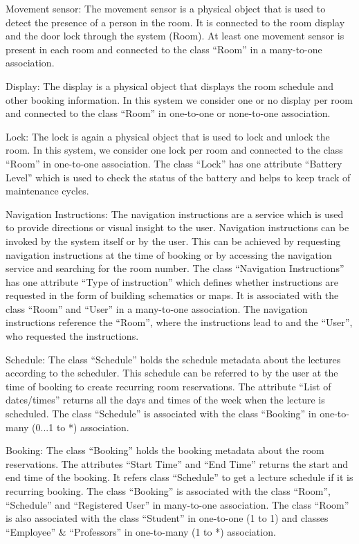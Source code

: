 \documentclass[conference,onecolumn]{IEEEtran}
\begin{document}
		Movement sensor: The movement sensor is a physical object that is used to detect the presence of a person in the room. It is connected to the room display and the door lock through the system (Room). At least one movement sensor is present in each room and connected to the class ``Room'' in a many-to-one association.
		
		Display: The display is a physical object that displays the room schedule and other booking information. In this system we consider one or no display per room and connected to the class ``Room'' in one-to-one or none-to-one association.

		Lock: The lock is again a physical object that is used to lock and unlock the room. In this system, we consider one lock per room and connected to the class ``Room'' in one-to-one association. The class ``Lock'' has one attribute ``Battery Level'' which is used to check the status of the battery and helps to keep track of maintenance cycles.

		Navigation Instructions: The navigation instructions are a service which is used to provide directions or visual insight to the user. Navigation instructions can be invoked by the system itself or by the user. This can be achieved by requesting navigation instructions at the time of booking or by accessing the navigation service and searching for the room number. The class ``Navigation Instructions'' has one attribute ``Type of instruction'' which defines whether instructions are requested in the form of building schematics or maps. It is associated with the class ``Room'' and ``User'' in a many-to-one association. The navigation instructions reference the ``Room'', where the instructions lead to and the ``User'', who requested the instructions.

		Schedule: The class ``Schedule'' holds the schedule metadata about the lectures according to the scheduler. This schedule can be referred to by the user at the time of booking to create recurring room reservations. The attribute ``List of dates/times'' returns all the days and times of the week when the lecture is scheduled. The class ``Schedule'' is associated with the class ``Booking'' in one-to-many (0...1 to *) association.

		Booking: The class ``Booking'' holds the booking metadata about the room reservations. The attributes ``Start Time'' and ``End Time'' returns the start and end time of the booking. It refers class ``Schedule'' to get a lecture schedule if it is recurring booking. The class ``Booking'' is associated with the class ``Room'', ``Schedule'' and ``Registered User'' in many-to-one association. The class ``Room'' is also associated with the class ``Student'' in one-to-one (1 to 1) and classes ``Employee'' \& ``Professors'' in one-to-many (1 to *) association.
\end{document}
